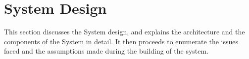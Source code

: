 \section{System Design}
This section discusses the System design, and explains the architecture and the components of the System in detail. It then proceeds to enumerate the issues faced and the assumptions made during the building of the system. 



